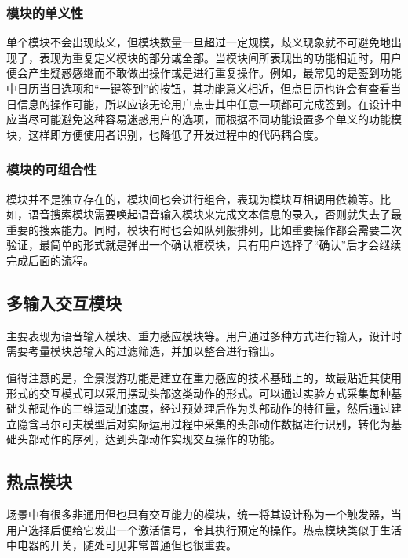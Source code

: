 \subsubsection{模块的单义性}
单个模块不会出现歧义，但模块数量一旦超过一定规模，歧义现象就不可避免地出现了，表现为重复定义模块的部分或全部。当模块间所表现出的功能相近时，用户便会产生疑惑感继而不敢做出操作或是进行重复操作。例如，最常见的是签到功能中日历当日选项和“一键签到”的按钮，其功能意义相近，但点日历也许会有查看当日信息的操作可能，所以应该无论用户点击其中任意一项都可完成签到。在设计中应当尽可能避免这种容易迷惑用户的选项，而根据不同功能设置多个单义的功能模块，这样即方便使用者识别，也降低了开发过程中的代码耦合度。

\subsubsection{模块的可组合性}
模块并不是独立存在的，模块间也会进行组合，表现为模块互相调用依赖等。比如，语音搜索模块需要唤起语音输入模块来完成文本信息的录入，否则就失去了最重要的搜索能力。同时，模块有时也会如队列般排列，比如重要操作都会需要二次验证，最简单的形式就是弹出一个确认框模块，只有用户选择了“确认”后才会继续完成后面的流程。


\subsection{多输入交互模块}
主要表现为语音输入模块、重力感应模块等。用户通过多种方式进行输入，设计时需要考量模块总输入的过滤筛选，并加以整合进行输出。

值得注意的是，全景漫游功能是建立在重力感应的技术基础上的，故最贴近其使用形式的交互模式可以采用摆动头部这类动作的形式。可以通过实验方式采集每种基础头部动作的三维运动加速度，经过预处理后作为头部动作的特征量，然后通过建立隐含马尔可夫模型后对实际运用过程中采集的头部动作数据进行识别，转化为基础头部动作的序列，达到头部动作实现交互操作的功能。

\subsection{热点模块}
场景中有很多非通用但也具有交互能力的模块，统一将其设计称为一个触发器，当用户选择后便给它发出一个激活信号，令其执行预定的操作。热点模块类似于生活中电器的开关，随处可见非常普通但也很重要。

